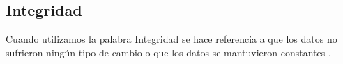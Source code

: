 \subsection{Integridad}
Cuando utilizamos la palabra Integridad se hace referencia a que los datos no sufrieron ningún tipo de cambio o que los datos se mantuvieron constantes \cite[]{retamal_Blockchain_2017,badreddin_Blockchain_2018}.